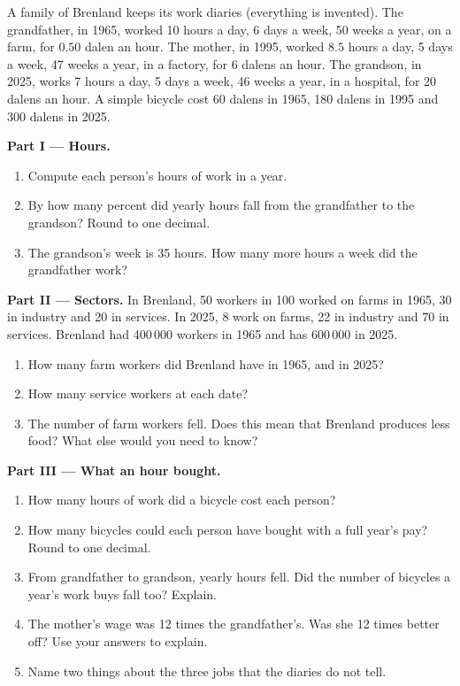 \begin{problem}
\label{pb:g6:school-and-work:1}
A family of Brenland keeps its work diaries (everything is invented). The
grandfather, in 1965, worked 10 hours a day, 6 days a week, 50 weeks a year,
on a farm, for $0.50$ dalen an hour. The mother, in 1995, worked $8.5$ hours a day,
5 days a week, 47 weeks a year, in a factory, for 6 dalens an hour. The grandson,
in 2025, works 7 hours a day, 5 days a week, 46 weeks a year, in a hospital, for
20 dalens an hour. A simple bicycle cost 60 dalens in 1965, 180 dalens in 1995 and
300 dalens in 2025.

\medskip
\noindent\textbf{Part I --- Hours.}
\begin{enumerate}
  \item Compute each person's hours of work in a year.
  \item By how many percent did yearly hours fall from the grandfather to the
        grandson? Round to one decimal.
  \item The grandson's week is 35 hours. How many more hours a week did the
        grandfather work?
\end{enumerate}

\medskip
\noindent\textbf{Part II --- Sectors.} In Brenland, 50 workers in 100 worked on
farms in 1965, 30 in industry and 20 in services. In 2025, 8 work on farms, 22
in industry and 70 in services. Brenland had 400\,000 workers in 1965 and has
600\,000 in 2025.
\begin{enumerate}[resume]
  \item How many farm workers did Brenland have in 1965, and in 2025?
  \item How many service workers at each date?
  \item The number of farm workers fell. Does this mean that Brenland produces
        less food? What else would you need to know?
\end{enumerate}

\medskip
\noindent\textbf{Part III --- What an hour bought.}
\begin{enumerate}[resume]
  \item How many hours of work did a bicycle cost each person?
  \item How many bicycles could each person have bought with a full year's pay?
        Round to one decimal.
  \item From grandfather to grandson, yearly hours fell. Did the number of
        bicycles a year's work buys fall too? Explain.
  \item The mother's wage was 12 times the grandfather's. Was she 12 times
        better off? Use your answers to explain.
  \item Name two things about the three jobs that the diaries do not tell.
\end{enumerate}
\end{problem}
